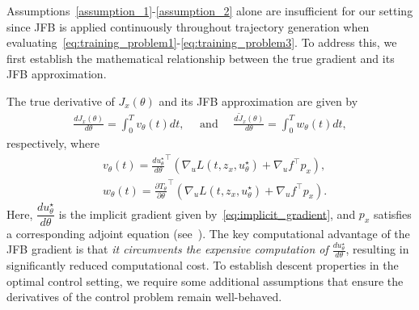 \documentclass[letterpaper, 10 pt, conference]{ieeeconf}  %
\begin{document}

    Assumptions~\ref{assumption_1}-\ref{assumption_2} alone are insufficient for our setting since JFB is applied continuously throughout trajectory generation when evaluating~\eqref{eq:training_problem1}-\eqref{eq:training_problem3}. To address this, we first establish the mathematical relationship between the true gradient and its JFB approximation.

    The true derivative of $J_x(\theta)$ and its JFB approximation are given by 
    \begin{align}
        \frac{dJ_x(\theta)}{d\theta} = \int_0^T v_\theta(t) dt, \quad \text{ and } \quad 
        \frac{d\tilde{J}_x(\theta)}{d\theta} = \int_0^T w_\theta(t) dt,
        \label{eq:full_derivatives}
    \end{align}
    respectively, where 
    \begin{equation}\label{eq:integrand_definitions}
        \begin{split}
        &v_\theta(t) = \frac{d u_\theta^\star}{d \theta}^{\top}(\nabla_u L(t,z_{x}, u_\theta^\star) + \nabla_u f^{\top}p_{x}), \\
        &w_\theta(t) = \frac{\partial T_\theta}{\partial  \theta}^{\top}(\nabla_u L(t,z_{x}, u_\theta^\star) + \nabla_u f^{\top}p_{x}).
        \end{split}
    \end{equation} 
    Here, $\dfrac{du_\theta^\star}{d\theta}$ is the implicit gradient given by~\eqref{eq:implicit_gradient}, and $p_x$ satisfies a corresponding adjoint equation (see~\cite[Eqn.~(6.11)]{evans1983introduction}). The key computational advantage of the JFB gradient is that \emph{it circumvents the expensive computation of $\frac{du_\theta^\star}{d\theta}$}, resulting in significantly reduced computational cost.
    To establish descent properties in the optimal control setting, we require some additional assumptions that ensure the derivatives of the control problem remain well-behaved.
\end{document}
